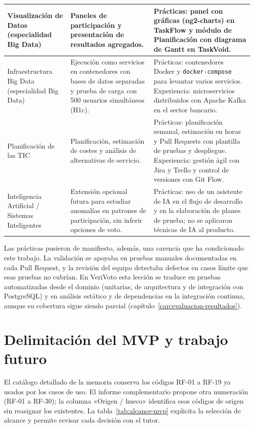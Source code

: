 \begin{longtable}{|>{\RaggedRight\arraybackslash}p{}|>{\RaggedRight\arraybackslash}p{}|>{\RaggedRight\arraybackslash}p{}|}
\hline
Visualización de Datos (especialidad Big Data) & Paneles de participación y presentación de resultados agregados. & Prácticas: panel con gráficas (ng2-charts) en TaskFlow y módulo de Planificación con diagrama de Gantt en TaskVoid. \\
\hline
Infraestructura Big Data (especialidad Big Data) & Ejecución como servicios en contenedores con bases de datos separadas y prueba de carga con 500 usuarios simultáneos (H1c). & Prácticas: contenedores Docker y \texttt{docker-compose} para levantar varios servicios. Experiencia: microservicios distribuidos con Apache Kafka en el sector bancario. \\
\hline
Planificación de las TIC & Planificación, estimación de costes y análisis de alternativas de servicio. & Prácticas: planificación semanal, estimación en horas y Pull Requests con plantilla de pruebas y despliegue. Experiencia: gestión ágil con Jira y Trello y control de versiones con Git Flow. \\
\hline
Inteligencia Artificial / Sistemas Inteligentes & Extensión opcional futura para estudiar anomalías en patrones de participación, sin inferir opciones de voto. & Prácticas: uso de un asistente de IA en el flujo de desarrollo y en la elaboración de planes de prueba; no se aplicaron técnicas de IA al producto. \\
\hline
\end{longtable}
\normalsize

Las prácticas pusieron de manifiesto, además, una carencia que ha
condicionado este trabajo. La validación se apoyaba en pruebas manuales
documentadas en cada Pull Request, y la revisión del equipo detectaba
defectos en casos límite que esas pruebas no cubrían. En VeriVoto esta
lección se traduce en pruebas automatizadas desde el dominio (unitarias, de
arquitectura y de integración con PostgreSQL) y en análisis estático y de
dependencias en la integración continua, aunque su cobertura sigue siendo
parcial (capítulo~\ref{cap:evaluacion-resultados}).

\section{Delimitación del MVP y trabajo futuro}
\label{sec:alcance-mvp}

El catálogo detallado de la memoria conserva los códigos RF-01 a RF-19 ya
usados por los casos de uso. El informe complementario propone otra numeración
(RF-01 a RF-30); la columna «Origen / hueco» identifica esos códigos de origen
sin reasignar los existentes. La tabla~\ref{tab:alcance-mvp} explicita la
selección de alcance y permite revisar cada decisión con el tutor.

